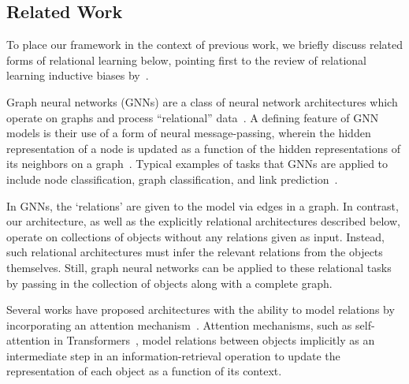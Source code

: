 \subsection{Related Work}\label{ssec:related_work}

To place our framework in the context of previous work, we briefly discuss related forms of relational learning below, pointing first to the review of relational learning inductive biases by~\citet{battagliaRelationalInductiveBiases2018}.

{Graph neural networks} (GNNs) are a class of neural network architectures which operate on graphs and process ``relational'' data~\citep[e.g.,][]{niepertLearningConvolutionalNeural2016,kipfSemiSupervisedClassificationGraph2017,schlichtkrullModelingRelationalData2017,velickovicGraphAttentionNetworks2017,kipfNeuralRelationalInference2018,xuHowPowerfulAre2018}. A defining feature of GNN models is their use of a form of neural message-passing, wherein the hidden representation of a node is updated as a function of the hidden representations of its neighbors on a graph~\citep{gilmerNeuralMessagePassing2017}. Typical examples of tasks that GNNs are applied to include node classification, graph classification, and link prediction~\citep{hamiltonGraphRepresentationLearning2020}. %

In GNNs, the `relations' are given to the model via edges in a graph. In contrast, our architecture, as well as the explicitly relational architectures described below, operate on collections of objects without any relations given as input. Instead, such relational architectures must infer the relevant relations from the objects themselves. Still, graph neural networks can be applied to these relational tasks by passing in the collection of objects along with a complete graph. %

Several works have proposed architectures with the ability to model relations by incorporating an {attention mechanism}~\citep[e.g.,][]{vaswani2017attention,velickovicGraphAttentionNetworks2017,santoroRelationalRecurrent2018,zambaldiDeepReinforcementLearning2018,locatelloObjectCentricLearningSlot2020}. Attention mechanisms, such as self-attention in Transformers~\citep{vaswani2017attention}, model relations between objects implicitly as an intermediate step in an information-retrieval operation
to update the representation of each object as a function of its context.

